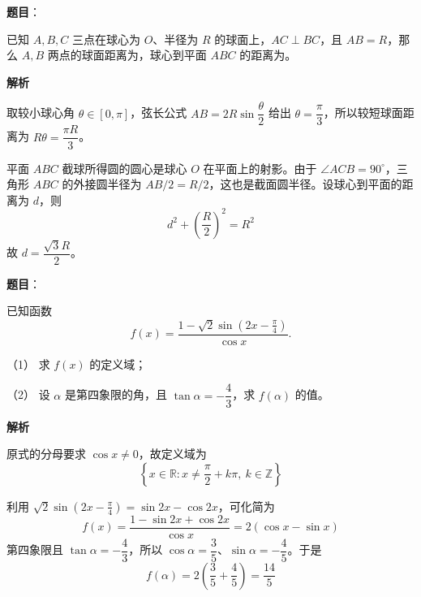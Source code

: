 \begin{answer}

\textbf{题目}：

已知 $A,B,C$ 三点在球心为 $O$、半径为 $R$ 的球面上，$AC\perp BC$，且 $AB=R$，那么 $A,B$ 两点的球面距离为\gkblank{}，球心到平面 $ABC$ 的距离为\gkblank{}。

\textbf{解析}

取较小球心角 $\theta\in[0,\pi]$，弦长公式 $AB=2R\sin\dfrac{\theta}{2}$ 给出 $\theta=\dfrac\pi3$，所以较短球面距离为 $R\theta=\dfrac{\pi R}{3}$。

平面 $ABC$ 截球所得圆的圆心是球心 $O$ 在平面上的射影。由于 $\angle ACB=90^\circ$，三角形 $ABC$ 的外接圆半径为 $AB/2=R/2$，这也是截面圆半径。设球心到平面的距离为 $d$，则
\nopagebreak[4]
\[
d^2+\left(\frac R2\right)^2=R^2
\]
故 $d=\dfrac{\sqrt3R}{2}$。


\end{answer}
\begin{answer}

\textbf{题目}：

已知函数
\nopagebreak[4]
\[
f(x)=\frac{1-\sqrt2\sin\left(2x-\frac\pi4\right)}{\cos x}.
\]

（1） 求 $f(x)$ 的定义域；

（2） 设 $\alpha$ 是第四象限的角，且 $\tan\alpha=-\dfrac43$，求 $f(\alpha)$ 的值。

\textbf{解析}


原式的分母要求 $\cos x\ne0$，故定义域为
\nopagebreak[4]
\[
\left\{x\in\mathbb R:x\ne\frac\pi2+k\pi,\ k\in\mathbb Z\right\}
\]


利用 $\sqrt2\sin(2x-\frac\pi4)=\sin2x-\cos2x$，可化简为
\nopagebreak[4]
\[
f(x)=\frac{1-\sin2x+\cos2x}{\cos x}=2(\cos x-\sin x)
\]
第四象限且 $\tan\alpha=-\dfrac43$，所以 $\cos\alpha=\dfrac35$、$\sin\alpha=-\dfrac45$。于是
\nopagebreak[4]
\[
f(\alpha)=2\left(\frac35+\frac45\right)=\frac{14}{5}
\]



\end{answer}
